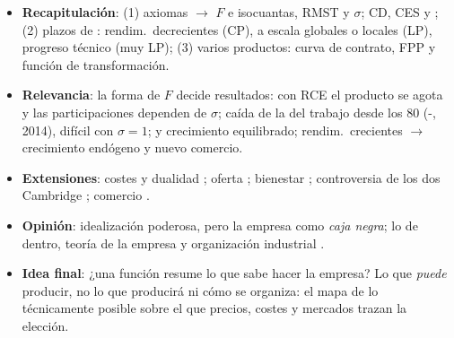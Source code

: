 \documentclass{article}
\begin{document}
\begin{columnas}
\begin{itemize}
\item \textbf{Recapitulación}: (1) axiomas $\to$ $F$ e isocuantas, RMST y $\sigma$; CD, CES y ; (2) plazos de : rendim.\ decrecientes (CP), a escala globales o locales (LP), progreso técnico (muy LP); (3) varios productos: curva de contrato, FPP y función de transformación.
\item \textbf{Relevancia}: la forma de $F$ decide resultados: con RCE el producto se agota y las participaciones dependen de $\sigma$; caída de la del trabajo desde los 80 (-, 2014), difícil con $\sigma=1$;  y crecimiento equilibrado; rendim.\ crecientes $\to$ crecimiento endógeno y nuevo comercio.
\item \textbf{Extensiones}: costes y dualidad ; oferta ; bienestar ; controversia de los dos Cambridge ; comercio .
\item \textbf{Opinión}: idealización poderosa, pero la empresa como \emph{caja negra}; lo de dentro, teoría de la empresa y organización industrial .
\item \textbf{Idea final}: ¿una función resume lo que sabe hacer la empresa? Lo que \emph{puede} producir, no lo que producirá ni cómo se organiza: el mapa de lo técnicamente posible sobre el que precios, costes y mercados trazan la elección.
\end{itemize}


\end{columnas}
\end{document}
